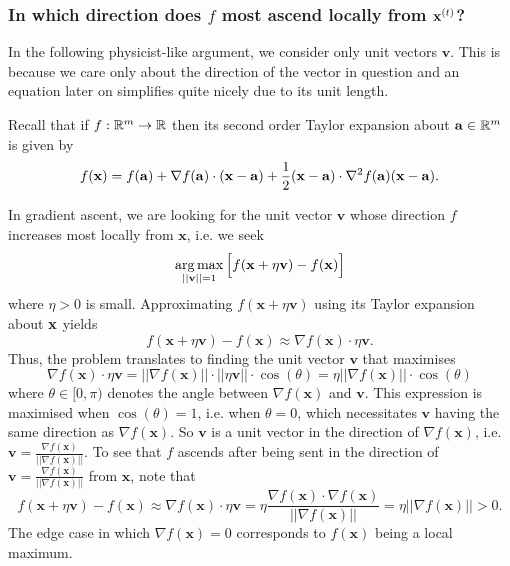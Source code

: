 \documentclass[11pt]{article}
\begin{document}
\subsubsection{In which direction does $f$ most ascend locally from $\mathbf{x}^{(t)}$?}
In the following physicist-like argument, we consider only unit vectors $\mathbf{v}$. This is because we care only about the direction of the vector in question and an equation later on simplifies quite nicely due to its unit length. 

\begin{tcolorbox}[title={\centering\textbf{Multivariate Taylor expansion}}, colback=myLightBlue, colbacktitle=myDarkBlue, colframe=myDarkBlue, coltitle=white]
    Recall that if $f:\mathbb{R}^m\to\mathbb{R}$ then its second order Taylor expansion about $\mathbf{a}\in\mathbb{R}^m$ is given by
    $$
    f(\mathbf{x})
    =
    f(\mathbf{a})+\nabla f(\mathbf{a})\cdot(\mathbf{x}-\mathbf{a})+\frac{1}{2}(\mathbf{x}-\mathbf{a})\cdot\nabla^2 f(\mathbf{a})(\mathbf{x}-\mathbf{a}).
    $$
\end{tcolorbox}

In gradient ascent, we are looking for the unit vector $\mathbf{v}$ whose direction $f$ increases most locally from $\mathbf{x}$, i.e. we seek
$$\operatorname*{arg\,max}_{||\mathbf{v}||=1}\Big[f(\mathbf{x}+\eta\mathbf{v})-f(\mathbf{x})\Big]$$
where $\eta>0$ is small. Approximating $f(\mathbf{x}+\eta\mathbf{v})$ using its Taylor expansion about $\mathbf{x}$ yields
$$
f(\mathbf{x}+\eta\mathbf{v})-f(\mathbf{x})
\approx
\nabla f(\mathbf{x})\cdot\eta\mathbf{v}.
$$
Thus, the problem translates to finding the unit vector $\mathbf{v}$ that maximises
$$
\nabla f(\mathbf{x})\cdot\eta\mathbf{v}=||\nabla f(\mathbf{x})||\cdot||\eta\mathbf{v}||\cdot\cos(\theta)=\eta||\nabla f(\mathbf{x})||\cdot\cos(\theta)
$$
where $\theta\in[0,\pi)$ denotes the angle between $\nabla f(\mathbf{x})$ and $\mathbf{v}$. This expression is maximised when $\cos(\theta)=1$, i.e. when $\theta=0$, which necessitates $\mathbf{v}$ having the same direction as $\nabla f(\mathbf{x})$. So $\mathbf{v}$ is a unit vector in the direction of $\nabla f(\mathbf{x})$, i.e. $\mathbf{v}=\frac{\nabla f(\mathbf{x})}{||\nabla f(\mathbf{x})||}$. To see that $f$ ascends after being sent in the direction of $\mathbf{v}=\frac{\nabla f(\mathbf{x})}{||\nabla f(\mathbf{x})||}$ from $\mathbf{x}$, note that
$$
f(\mathbf{x}+\eta\mathbf{v})-f(\mathbf{x})
\approx
\nabla f(\mathbf{x})\cdot\eta\mathbf{v}
=
\eta\frac{\nabla f(\mathbf{x})\cdot\nabla f(\mathbf{x})}{||\nabla f(\mathbf{x})||}
=
\eta||\nabla f(\mathbf{x})||
>
0.
$$
The edge case in which $\nabla f(\mathbf{x})=0$ corresponds to $f(\mathbf{x})$ being a local maximum.
\end{document}
